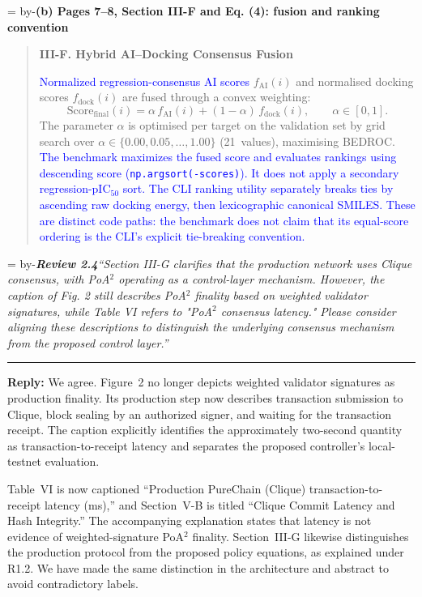 \documentclass[11pt]{article}
\newenvironment{excerpt}{\begin{quote}\small\sloppy}{\end{quote}}
\newcommand{\roomfor}[1]{\par\begingroup\dimen0=\pagegoal\advance\dimen0 by-\pagetotal\ifdim\dimen0<#1\baselineskip\newpage\fi\endgroup}
\newcommand{\review}[2]{\roomfor{10}\bigskip\noindent\textbf{\textit{Review #1}}\quad\textit{``#2''}\par\smallskip\hrule\medskip}
\newcommand{\reply}{\noindent\textbf{Reply:} }
\newcommand{\loc}[1]{\roomfor{7}\medskip\noindent\textbf{#1}\par\smallskip}
\newcommand{\mshead}[2]{\par\noindent\textbf{#1. #2}\par\smallskip}
\begin{document}
\loc{(b) Pages 7--8, Section III-F and Eq. (4): fusion and ranking convention}
\begin{excerpt}
\mshead{III-F}{Hybrid AI--Docking Consensus Fusion}

\textcolor{blue}{Normalized regression-consensus AI scores} $f_{\mathrm{AI}}(i)$ and normalised
docking scores $f_{\mathrm{dock}}(i)$ are fused through
a convex weighting:
\begin{equation}
\mathrm{Score}_{\mathrm{final}}(i)
  = \alpha \, f_{\mathrm{AI}}(i)
  + (1 - \alpha)\, f_{\mathrm{dock}}(i),
\qquad \alpha \in [0, 1].
\tag{4}
\end{equation}
The parameter $\alpha$ is optimised per target on the
validation set by grid search over
$\alpha \in \{0.00, 0.05, \ldots, 1.00\}$ (21~values),
maximising BEDROC.
\textcolor{blue}{The benchmark maximizes the fused score and evaluates
rankings using descending score (\texttt{np.argsort(-scores)}).
It does not apply a secondary regression-pIC$_{50}$ sort. The CLI
ranking utility separately breaks ties by ascending raw docking
energy, then lexicographic canonical SMILES. These are distinct
code paths: the benchmark does not claim that its equal-score
ordering is the CLI's explicit tie-breaking convention.}
\end{excerpt}

\review{2.4}{Section III-G clarifies that the production network uses Clique consensus, with PoA$^2$ operating as a control-layer mechanism. However, the caption of Fig. 2 still describes PoA$^2$ finality based on weighted validator signatures, while Table VI refers to "PoA$^2$ consensus latency." Please consider aligning these descriptions to distinguish the underlying consensus mechanism from the proposed control layer.}

\reply We agree. Figure~2 no longer depicts weighted
validator signatures as production finality. Its production step now
describes transaction submission to Clique, block sealing by an authorized
signer, and waiting for the transaction receipt. The caption explicitly
identifies the approximately two-second quantity as transaction-to-receipt
latency and separates the proposed controller's local-testnet evaluation.

Table~VI is now captioned ``Production PureChain (Clique)
transaction-to-receipt latency (ms),'' and Section~V-B is titled
``Clique Commit Latency and Hash Integrity.'' The accompanying explanation
states that latency is not evidence of weighted-signature PoA$^2$ finality.
Section~III-G likewise distinguishes the production protocol from the
proposed policy equations, as explained under R1.2. We have made the same
distinction in the architecture and abstract to avoid contradictory labels.
\end{document}

